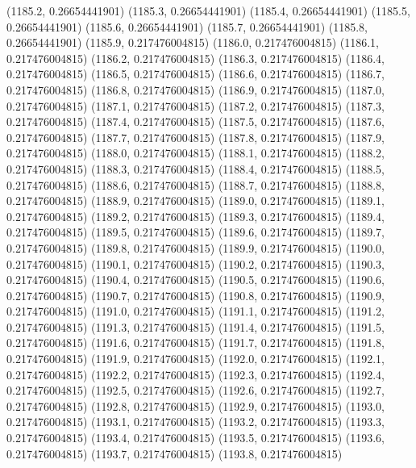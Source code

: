 {					(1185.2, 0.26654441901)
					(1185.3, 0.26654441901)
					(1185.4, 0.26654441901)
					(1185.5, 0.26654441901)
					(1185.6, 0.26654441901)
					(1185.7, 0.26654441901)
					(1185.8, 0.26654441901)
					(1185.9, 0.217476004815)
					(1186.0, 0.217476004815)
					(1186.1, 0.217476004815)
					(1186.2, 0.217476004815)
					(1186.3, 0.217476004815)
					(1186.4, 0.217476004815)
					(1186.5, 0.217476004815)
					(1186.6, 0.217476004815)
					(1186.7, 0.217476004815)
					(1186.8, 0.217476004815)
					(1186.9, 0.217476004815)
					(1187.0, 0.217476004815)
					(1187.1, 0.217476004815)
					(1187.2, 0.217476004815)
					(1187.3, 0.217476004815)
					(1187.4, 0.217476004815)
					(1187.5, 0.217476004815)
					(1187.6, 0.217476004815)
					(1187.7, 0.217476004815)
					(1187.8, 0.217476004815)
					(1187.9, 0.217476004815)
					(1188.0, 0.217476004815)
					(1188.1, 0.217476004815)
					(1188.2, 0.217476004815)
					(1188.3, 0.217476004815)
					(1188.4, 0.217476004815)
					(1188.5, 0.217476004815)
					(1188.6, 0.217476004815)
					(1188.7, 0.217476004815)
					(1188.8, 0.217476004815)
					(1188.9, 0.217476004815)
					(1189.0, 0.217476004815)
					(1189.1, 0.217476004815)
					(1189.2, 0.217476004815)
					(1189.3, 0.217476004815)
					(1189.4, 0.217476004815)
					(1189.5, 0.217476004815)
					(1189.6, 0.217476004815)
					(1189.7, 0.217476004815)
					(1189.8, 0.217476004815)
					(1189.9, 0.217476004815)
					(1190.0, 0.217476004815)
					(1190.1, 0.217476004815)
					(1190.2, 0.217476004815)
					(1190.3, 0.217476004815)
					(1190.4, 0.217476004815)
					(1190.5, 0.217476004815)
					(1190.6, 0.217476004815)
					(1190.7, 0.217476004815)
					(1190.8, 0.217476004815)
					(1190.9, 0.217476004815)
					(1191.0, 0.217476004815)
					(1191.1, 0.217476004815)
					(1191.2, 0.217476004815)
					(1191.3, 0.217476004815)
					(1191.4, 0.217476004815)
					(1191.5, 0.217476004815)
					(1191.6, 0.217476004815)
					(1191.7, 0.217476004815)
					(1191.8, 0.217476004815)
					(1191.9, 0.217476004815)
					(1192.0, 0.217476004815)
					(1192.1, 0.217476004815)
					(1192.2, 0.217476004815)
					(1192.3, 0.217476004815)
					(1192.4, 0.217476004815)
					(1192.5, 0.217476004815)
					(1192.6, 0.217476004815)
					(1192.7, 0.217476004815)
					(1192.8, 0.217476004815)
					(1192.9, 0.217476004815)
					(1193.0, 0.217476004815)
					(1193.1, 0.217476004815)
					(1193.2, 0.217476004815)
					(1193.3, 0.217476004815)
					(1193.4, 0.217476004815)
					(1193.5, 0.217476004815)
					(1193.6, 0.217476004815)
					(1193.7, 0.217476004815)
					(1193.8, 0.217476004815)
}
